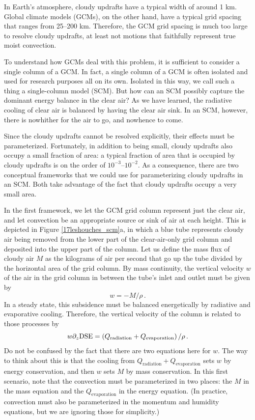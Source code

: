 \documentclass[12pt]{article}
\newcommand{\dse}{{\text{DSE}}}
\begin{document}
In Earth's atmosphere, cloudy updrafts have a typical width of around 1 km.  Global climate models (GCMs), on the other hand, have a typical grid spacing that ranges from 25--200 km.  Therefore, the GCM grid spacing is much too large to resolve cloudy updrafts, at least not motions that faithfully represent true moist convection.  


To understand how GCMs deal with this problem, it is sufficient to consider a single column of a GCM.  In fact, a single column of a GCM is often isolated and used for research purposes all on its own.  Isolated in this way, we call such a thing a single-column model (SCM).  But how can an SCM possibly capture the dominant energy balance in the clear air?  As we have learned, the radiative cooling of clear air is balanced by having the clear air sink.  In an SCM, however, there is nowhither for the air to go, and nowhence to come.


Since the cloudy updrafts cannot be resolved explicitly, their effects must be parameterized.  Fortunately, in addition to being small, cloudy updrafts also occupy a small fraction of area: a typical fraction of area that is occupied by cloudy updrafts is on the order of $10^{-3}$--$10^{-2}$.  As a consequence, there are two conceptual frameworks that we could use for parameterizing cloudy updrafts in an SCM.  Both take advantage of the fact that cloudy updrafts occupy a very small area.


In the first framework, we let the GCM grid column represent just the clear air, and let convection be an appropriate source or sink of air at each height.  This is depicted in Figure \ref{17leshouches_scm}a, in which a blue tube represents cloudy air being removed from the lower part of the clear-air-only grid column and deposited into the upper part of the column.  Let us define the mass flux of cloudy air $M$ as the kilograms of air per second that go up the tube divided by the horizontal area of the grid column.  By mass continuity, the vertical velocity $w$ of the air in the grid column in between the tube's inlet and outlet must be given by
\begin{equation}
w = - M/\rho \, . \label{framework1_mass}
\end{equation}
In a steady state, this subsidence must be balanced energetically by radiative and evaporative cooling.  Therefore, the vertical velocity of the column is related to those processes by
\begin{equation}
w \ppz \dse = \left( Q_{\text{radiation}} + Q_{\text{evaporation}} \right) / \rho \, . \label{framework1_energy}
\end{equation}
Do not be confused by the fact that there are two equations here for $w$.  The way to think about this is that the cooling from $Q_{\text{radiation}} + Q_{\text{evaporation}}$ sets $w$ by energy conservation, and then $w$ sets $M$ by mass conservation.  In this first scenario, note that the convection must be parameterized in two places: the $M$ in the mass equation and the $Q_{\text{evaporation}}$ in the energy equation.  (In practice, convection must also be parameterized in the momentum and humidity equations, but we are ignoring those for simplicity.)
\end{document}
